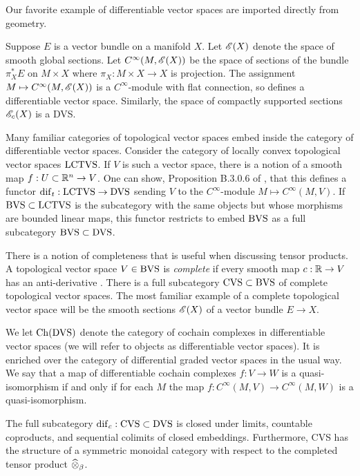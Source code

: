 Our favorite example of differentiable vector spaces are imported directly from geometry.

\begin{eg}
Suppose $E$ is a vector bundle on a manifold $X$. 
Let $\mathscr E(X)$ denote the space of smooth global sections.
Let $C^\infty(M, \mathscr E(X))$ be the space of sections of the bundle $\pi_X^*E$ on $M \times X$ where $\pi_X : M \times X \to X$ is projection. 
The assignment $M \mapsto C^\infty(M , \mathscr E(X))$ is a $C^\infty$-module with flat connection, so defines a differentiable vector space.
Similarly, the space of compactly supported sections $\mathscr E_c(X)$ is a DVS. 
\end{eg}

Many familiar categories of topological vector spaces embed inside the category of differentiable vector spaces. 
Consider the category of locally convex topological vector spaces ${\rm LCTVS}$.
If $V$ is such a vector space, there is a notion of a smooth map $f : U \subset \mathbb R^n \to V$.
One can show, Proposition B.3.0.6 of \cite{CG1}, that this defines a functor ${\rm dif}_t : {\rm LCTVS} \to {\rm DVS}$ sending $V$ to the $C^\infty$-module $M \mapsto C^\infty(M, V)$.
If ${\rm BVS} \subset {\rm LCTVS}$ is the subcategory with the same objects but whose morphisms are bounded linear maps, this functor restricts to embed ${\rm BVS}$ as a full subcategory ${\rm BVS} \subset {\rm DVS}$. 

There is a notion of completeness that is useful when discussing tensor products. 
A topological vector space $V \in {\rm BVS}$ is {\em complete} if every smooth map $c : \mathbb R \to V$ has an anti-derivative \cite{KM97}.
There is a full subcategory ${\rm CVS} \subset {\rm BVS}$ of complete topological vector spaces.
The most familiar example of a complete topological vector space will be the smooth sections $\mathscr E(X)$ of a vector bundle $E \to X$.

We let ${\rm Ch}({\rm DVS})$ denote the category of cochain complexes in differentiable vector spaces (we will refer to objects as differentiable vector spaces). 
It is enriched over the category of differential graded vector spaces in the usual way.
We say that a map of differentiable cochain complexes $f : V \to W$ is a quasi-isomorphism if and only if for each $M$ the map $f : C^\infty(M, V) \to C^\infty(M,W)$ is a quasi-isomorphism.

\begin{thm}
The full subcategory ${\rm dif}_c : {\rm CVS} \subset {\rm DVS}$ is closed under limits, countable coproducts, and sequential colimits of closed embeddings. 
Furthermore, {\rm CVS} has the structure of a symmetric monoidal category with respect to the completed tensor product $\widehat{\otimes}_{\beta}$. 
\end{thm}


